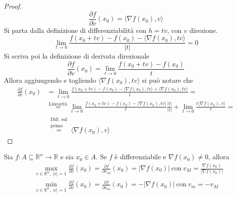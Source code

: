 \begin{proof}
        \begin{equation*}
            \frac{\partial{f}}{\partial{v}}(x_0)=\langle \nabla f(x_0), v\rangle
        \end{equation*}
        Si parta dalla definizione di differenziabilità con $h=tv$, con $v$ direzione.
        \begin{equation*}
            \lim_{t \to 0} {\frac{f(x_0+tv)-f(x_0)-\langle \nabla f (x_0), tv \rangle}{|t|}}=0
        \end{equation*}
        Si scriva poi la definizione di derivata direzionale
        \begin{equation*}
            \frac{\partial f}{\partial v}(x_0)= \lim_{t \to 0}{\frac{f(x_0+tv)- f(x_0)}{t}}
        \end{equation*}
        Allora aggiungendo e togliendo $\langle \nabla f (x_0), tv \rangle$ si può notare che
        \begin{equation*}
            \begin{aligned}
                \frac{\partial f}{\partial v}(x_0)&= \lim_{t \to 0}{\frac{f(x_0+tv)- f(x_0) -\langle \nabla f (x_0), tv \rangle+ \langle \nabla f (x_0), tv \rangle}{t}}=\\
                &\overset{\text{Linearità}}{=} \lim_{t \to 0}{\frac{f(x_0+tv)- f(x_0) -\langle \nabla f (x_0), tv \rangle}{t} \frac{|t|}{|t|}} + \lim_{t \to 0}{\frac{t \langle \nabla f (x_0), v \rangle}{t}}=\\
                &\overset{\substack{\text{Diff. sul}\\\text{primo}}}{=} \langle \nabla f (x_0), v \rangle
            \end{aligned}
        \end{equation*}
    \end{proof}
\begin{proposition} \label{Prop: Interpretazione geometrica del gradiente}
    Sia $f: A \subseteq \mathbb{R}^n \to \mathbb{R}$ e sia $x_0 \in A$. Se $f$ è differenziabile e $\nabla f(x_0) \neq 0$, allora
    \begin{equation*}
        \begin{aligned}
            &\max_{v \in \mathbb{R}^n,\ |v|=1}{\frac{\partial f}{\partial v}{(x_0)}}=\frac{\partial f}{\partial v_M}(x_0)=|\nabla f(x_0)|\ \text{con}\ v_M= \frac{\nabla f(x_0)}{|\nabla f(x_0)|}\\
            &\min_{v \in \mathbb{R}^n,\ |v|=1}{\frac{\partial f}{\partial v}{(x_0)}}=\frac{\partial f}{\partial v_m}(x_0)=-|\nabla f(x_0)|\ \text{con}\ v_m= -v_M
        \end{aligned}
    \end{equation*}
    \end{proposition}

